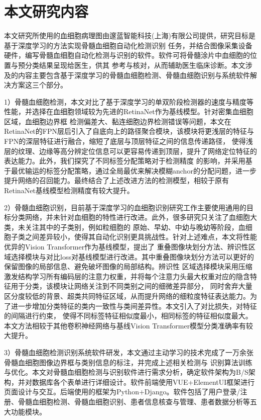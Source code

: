 \section{本文研究内容}
本文研究所使用的血细胞病理图由邃蓝智能科技(上海)有限公司提供，研究目标是基于深度学习的方法实现骨髓血细胞自动化检测识别
任务，并结合图像采集设备硬件，编写骨髓血细胞自动化检测与识别的软件。软件可将骨髓涂片中血细胞的位置与预分类结果呈现给医生，供其
参考与核对，从而辅助医生临床诊断。本文涉及的内容主要包含基于深度学习的骨髓血细胞检测、骨髓血细胞识别与系统软件解决方案这三个部分。

1）骨髓血细胞检测，本文对比了基于深度学习的单双阶段检测器的速度与精度等性能，并选择在血细胞领域较为先进的RetinaNet作为基线模型。针对密集血细胞区域，血细胞边界框
检测偏差大、黏连细胞边界检测错误等问题，本文在RetinaNet的FPN层后引入了自底向上的路径聚合模块，该模块将更浅层的特征与FPN的深层特征进行融合，缩短了底层与顶层特征之间的信息传递路径，
使得浅层的纹理、边缘等高分辨定位信息可以更容易传递到顶层，提升了网络定位特征的表达能力。此外，我们探究了不同标签分配策略对于检测精度
的影响，并采用基于最优输运的标签分配策略，通过全局最优来解决模糊anchor的分配问题，进一步提升网络的召回能力。最终结合了上述改进方法的检测模型，相较于原有RetinaNet基线模型检测精度有较大提升。

2）骨髓血细胞识别，目前基于深度学习的血细胞识别研究工作主要使用通用的目标分类网络，并未针对血细胞的特性进行改进。此外，很多研究只关注了血细胞大类，未关注其中的子类别，例如粒细胞的
原始、早幼、中幼与晚幼等阶段，血细胞子类之间差异较小，使得其自动化识别更具挑战性。针对上述难点，本文将性能优异的Vision Transformer作为基线模型，提出了
重叠图像块划分方法、辨识性区域选择模块与对比loss对基线模型进行改进。其中重叠图像块划分方法可以更好的保留图像的局部信息、避免破坏图像的局部结构。辨识性
区域选择模块采用压缩激发结构学习所有编码层的注意力权重，并将每个注意力头最大权重对应的隐含特征用于分类，该模块让网络关注到不同类别之间的细微差异部分，
同时舍弃大量区分度较低的背景、超类共同特征区域，从而提升网络的细粒度特征表达能力。为了进一步增加分类特征的类内一致性与类间差异性。本文引入了对比损失，对特征的间隔进行约束，
使得不同标签特征相似度最小，相同标签的特征相似度最大。本文方法相较于其他卷积神经网络与基线Vision Transformer模型分类准确率有较大提升。

3）骨髓血细胞检测识别系统软件研发，本文通过主动学习的技术完成了一万余张骨髓血细胞图像边界框与类别信息的标注，并完成上述相关检测与
识别算法训练与优化。本文对骨髓血细胞检测与识别软件进行需求分析，确定软件架构为B/S架构，并对数据库各个表单进行详细设计。软件前端使用VUE+ElementUI框架进行
页面设计与交互。后端使用的框架为Python+Django。软件包括了用户登录/注册、骨髓血细胞检测、骨髓血细胞识别、患者信息核查与管理、患者数据分析等五大功能模块。

